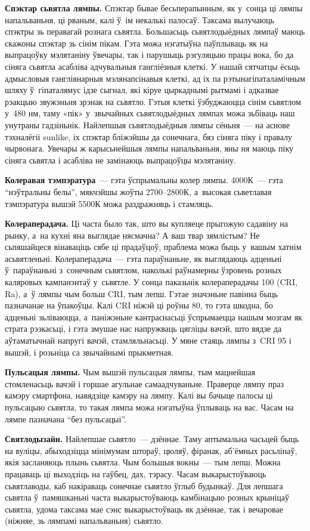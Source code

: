\textbf{Спэктар сьвятла лямпы.} Спэктар бывае бесьперапынным, як у~сонца ці лямпы напальваньня, ці рваным, калі ў~ім некалькі палосаў. Таксама вылучаюць спэктры зь перавагай рознага сьвятла. Большасьць сьвятлодыёдных лямпаў маюць скажоны спэктар зь сінім пікам. Гэта можа нэгатыўна паўплываць як на выпрацоўку мэлятаніну ўвечары, так і парушыць рэгуляцыю працы вока, бо да сіняга сьвятла асабліва адчувальныя гангліёзныя клеткі. У нашай сятчатцы ёсьць адмысловыя гангліянарныя мэлянапсінавыя клеткі, ад іх па рэтынагіпаталамічным шляху ў~гіпаталямус ідзе сыгнал, які кіруе цыркаднымі рытмамі і адказвае рэакцыю звужэньня зрэнак на сьвятло. Гэтыя клеткі ўзбуджаюцца сінім сьвятлом у~480 нм, таму «пік» у~звычайных сьвятлодыёдных лямпах можа зьбіваць наш унутраны гадзіньнік. Найлепшыя сьвятлодыёдныя лямпы сёньня~--- на аснове тэхналёгіі sunlike, іх спэктар бліжэйшы да сонечнага, бяз сіняга піку і правалу чырвонага. Увечары ж карысьнейшыя лямпы напальваньня, яны ня маюць піку сіняга сьвятла і асабліва не замінаюць выпрацоўцы мэлятаніну.

\textbf{Колеравая тэмпэратура}~--- гэта ўспрымальны колер лямпы. 4000К~--- гэта ``нэўтральны белы'', мякчэйшы жоўты 2700--2800К, а~высокая сьветлавая тэмпэратура вышэй 5500К можа раздражняць і стамляць.

\textbf{Колераперадача.} Ці часта было так, што вы купляеце прыгожую садавіну на рынку, а~на кухні яна выглядае нясмачна? А ваш твар зямлістым? Не сьпяшайцеся вінаваціць сябе ці прадаўцоў, праблема можа быць у~вашым хатнім асьвятленьні. Колераперадача~--- гэта параўнаньне, як выглядаюць адценьні ў~параўнаньні з~сонечным сьвятлом, наколькі раўнамерны ўзровень розных каляровых кампанэнтаў у~сьвятле. У сонца паказьнік колераперадачы 100 (CRI, Ra), а~ў лямпы чым больш CRI, тым лепш. Гэтае значэньне павінна быць пазначанае на ўпакоўцы. Калі CRI ніжэй ці роўны 80, то гэта шкодна, бо адценьні зьліваюцца, а~паніжэньне кантраснасьці ўспрымаецца нашым мозгам як страта рэзкасьці, і гэта змушае нас напружваць цягліцы вачэй, што вядзе да аўтаматычнай напругі вачэй, стамляльнасьці. У мяне стаяць лямпы з~CRI 95 і вышэй, і розьніца са звычайнымі прыкметная.

\textbf{Пульсацыя лямпы.} Чым вышэй пульсацыя лямпы, тым мацнейшая стомленасьць вачэй і горшае агульнае самаадчуваньне. Праверце лямпу праз камэру смартфона, навядзіце камэру на лямпу. Калі вы бачыце палосы ці пульсацыю сьвятла, то такая лямпа можа нэгатыўна ўплываць на вас. Часам на лямпе пазначана ``без пульсацыі''.

\textbf{Святлодызайн.} Найлепшае сьвятло~--- дзённае. Таму аптымальна часьцей быць на вуліцы, абыходзіцца мінімумам штораў, цюляў, фіранак, аб'ёмных расьлінаў, якія засланяюць плынь сьвятла. Чым большыя вокны~--- тым лепш. Можна працаваць ці выходзіць на гаўбец, дах, тэрасу. Часам выкарыстоўваюць сьвятлаводы, каб накіраваць сонечнае сьвятло ўглыб будынкаў. Для лепшага сьвятла ў~памяшканьні часта выкарыстоўваюць камбінацыю розных крыніцаў сьвятла, удома таксама мае сэнс выкарыстоўваць як дзённае, так і вечаровае (ніжняе, зь лямпамі напальваньня) сьвятло.

